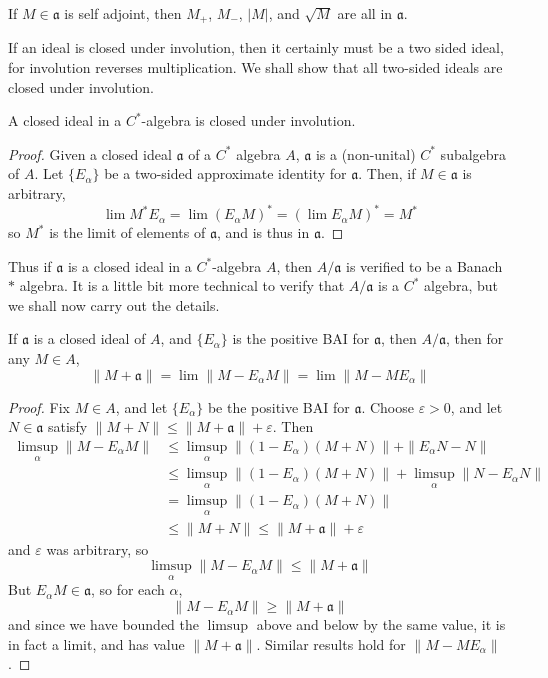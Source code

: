 \begin{corollary}
    If $M \in \mathfrak{a}$ is self adjoint, then $M_+$, $M_-$, $|M|$, and $\sqrt{M}$ are all in $\mathfrak{a}$.
\end{corollary}

If an ideal is closed under involution, then it certainly must be a two sided ideal, for involution reverses multiplication. We shall show that all two-sided ideals are closed under involution.

\begin{prop}
    A closed ideal in a $C^*$-algebra is closed under involution.
\end{prop}
\begin{proof}
    Given a closed ideal $\mathfrak{a}$ of a $C^*$ algebra $A$, $\mathfrak{a}$ is a (non-unital) $C^*$ subalgebra of $A$. Let $\{ E_\alpha \}$ be a two-sided approximate identity for $\mathfrak{a}$. Then, if $M \in \mathfrak{a}$ is arbitrary,
    \[ \lim M^*E_\alpha = \lim (E_\alpha M)^* = (\lim E_\alpha M)^* = M^* \]
    so $M^*$ is the limit of elements of $\mathfrak{a}$, and is thus in $\mathfrak{a}$.
\end{proof}

Thus if $\mathfrak{a}$ is a closed ideal in a $C^*$-algebra $A$, then $A/\mathfrak{a}$ is verified to be a Banach $*$ algebra. It is a little bit more technical to verify that $A/\mathfrak{a}$ is a $C^*$ algebra, but we shall now carry out the details.

\begin{lemma}
    If $\mathfrak{a}$ is a closed ideal of $A$, and $\{ E_\alpha \}$ is the positive BAI for $\mathfrak{a}$, then $A/\mathfrak{a}$, then for any $M \in A$,
    \[ \| M + \mathfrak{a} \| = \lim \| M - E_\alpha M \| = \lim \| M - M E_\alpha \| \]
\end{lemma}
\begin{proof}
    Fix $M \in A$, and let $\{ E_\alpha \}$ be the positive BAI for $\mathfrak{a}$. Choose $\varepsilon > 0$, and let $N \in \mathfrak{a}$ satisfy $\| M + N \| \leq \| M + \mathfrak{a} \| + \varepsilon$. Then
    \begin{align*}
        \limsup_\alpha \| M - E_\alpha M \| &\leq \limsup_\alpha \| (1 - E_\alpha)(M + N) \| + \| E_\alpha N - N \|\\
        &\leq \limsup_\alpha \| (1 - E_\alpha)(M + N) \| + \limsup_\alpha \| N - E_\alpha N \|\\
        &= \limsup_\alpha \| (1 - E_\alpha) (M + N) \|\\
        &\leq \| M + N \| \leq \| M + \mathfrak{a} \| + \varepsilon
    \end{align*}
    and $\varepsilon$ was arbitrary, so
    \[ \limsup_\alpha \| M - E_\alpha M \| \leq \| M + \mathfrak{a} \| \]
    But $E_\alpha M \in \mathfrak{a}$, so for each $\alpha$,
    \[ \| M - E_\alpha M \| \geq \| M + \mathfrak{a} \| \]
    and since we have bounded the $\limsup$ above and below by the same value, it is in fact a limit, and has value $\| M + \mathfrak{a} \|$. Similar results hold for $\| M - M E_\alpha \|$.
\end{proof}

